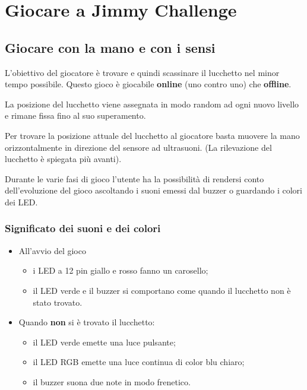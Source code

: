 \chapter{Giocare a Jimmy Challenge}
\section{Giocare con la mano e con i sensi}
L'obiettivo del giocatore è trovare e quindi scassinare il lucchetto nel minor tempo possibile. Questo gioco è giocabile \textbf{online} (uno contro uno) che \textbf{offline}.

La posizione del lucchetto viene assegnata in modo random ad ogni nuovo livello e rimane fissa fino al suo superamento.

Per trovare la posizione attuale del lucchetto al giocatore basta muovere la mano orizzontalmente in direzione del sensore ad ultrasuoni. (La rilevazione del lucchetto è spiegata più avanti).

Durante le varie fasi di gioco l'utente ha la possibilità di rendersi conto dell'evoluzione del gioco ascoltando i suoni emessi dal buzzer o guardando i colori dei LED.

\subsection{Significato dei suoni e dei colori}
\begin{itemize}
	\item All'avvio del gioco
	\begin{itemize}
		\item i LED a 12 pin giallo e rosso fanno un carosello;
		\item il LED verde e il buzzer si comportano come quando il lucchetto non è stato trovato.
	\end{itemize}
\end{itemize}


\begin{itemize}
	\item Quando \textbf{non} si è trovato il lucchetto:
	\begin{itemize}
		\item il LED verde emette una luce pulsante;
		\item il LED RGB emette una luce continua di color blu chiaro;
		\item il buzzer suona due note in modo frenetico.
	\end{itemize}
\end{itemize}

